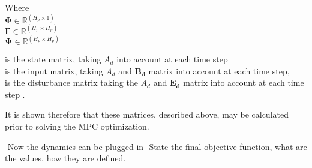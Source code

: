 
\begin{minipage}[t]{0.20\textwidth}
Where\\
\hspace*{8mm} $\bm{\Phi} \in \mathbb{R}^{(H_p \times 1)}$ \\
\hspace*{8mm} $\bm{\Gamma} \in \pmb{\mathbb{R}}^{(H_p \times H_p)}$ \\
\hspace*{8mm} $\bm{\Psi} \in \pmb{\mathbb{R}}^{(H_p \times H_p)}$ 
\end{minipage}
\begin{minipage}[t]{0.68\textwidth}
\vspace*{2mm}
is the state matrix, taking $A_d$ into account at each time step \\
is the input matrix, taking $A_d$ and $\bm{B_d}$ matrix into account at each time step, \\
is the disturbance matrix taking the $A_d$ and $\bm{E_d}$ matrix into account at each time step . \\ 
\end{minipage}

It is shown therefore that these matrices, described above, may be calculated prior to solving the MPC optimization. 

-Now the dynamics can be plugged in
-State the final objective function, what are the values, how they are defined. 